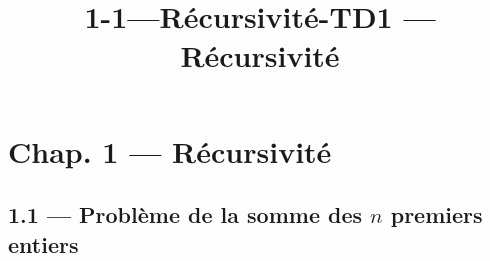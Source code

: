 \documentclass[a4paper,17pt]{extarticle}
\title{1-1---Récursivité-TD}
\begin{document}
    
    \title{1 --- Récursivité}

    
    

    
    \hypertarget{chap.-1-ruxe9cursivituxe9}{%
\section{Chap. 1 --- Récursivité}\label{chap.-1-ruxe9cursivituxe9}}

    \hypertarget{probluxe8me-de-la-somme-des-n-premiers-entiers}{%
\subsection{\texorpdfstring{1.1 --- Problème de la somme des \(n\)
premiers
entiers}{1.1 --- Problème de la somme des n premiers entiers}}\label{probluxe8me-de-la-somme-des-n-premiers-entiers}}
\end{document}
